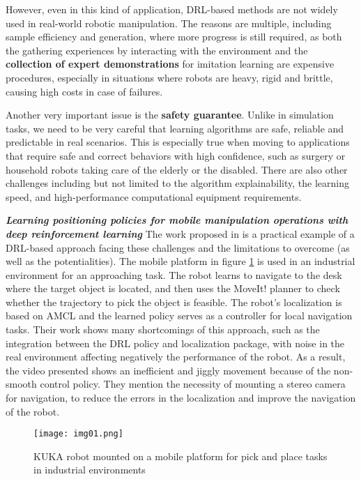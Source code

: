 However, even in this kind of application, DRL-based methods are not widely
used in real-world robotic manipulation. The reasons are multiple, including sample efficiency and generation,
where more progress is still required, as both the gathering experiences by interacting with
the environment and the \textbf{collection of expert demonstrations} for imitation learning are expensive
procedures, especially in situations where robots are heavy, rigid and brittle, causing high costs in case of failures.

Another very important issue is the \textbf{safety guarantee}.
Unlike in simulation tasks, we need to be very careful that learning
algorithms are safe, reliable and predictable in real scenarios. This is especially true
when moving to applications that require safe and correct behaviors with high confidence, such as
surgery or household robots taking care of the elderly or the disabled. There are also other
challenges including but not limited to the algorithm explainability, the learning speed,
and high-performance computational equipment requirements. \cite{liu2021deep}

\textbf{\textit{Learning positioning policies for mobile manipulation operations
		with deep reinforcement learning}}
\quad
The work proposed in \cite{iriondo2023learning} is a practical example of a DRL-based approach
facing these challenges and the limitations to overcome (as well as the potentialities).
The mobile platform in figure \ref{fig:img01} is used in an industrial environment for an
approaching task. The robot learns to navigate to the desk where the target object is located,
and then uses the MoveIt! planner to check whether the trajectory to pick the object is feasible.
The robot's localization is based on AMCL and the learned policy serves as a controller for
local navigation tasks. Their work shows many shortcomings of this approach, such as the
integration between the DRL policy and localization package, with noise in the
real environment affecting negatively the performance of the robot. As a result,
the video presented shows an inefficient and jiggly movement
because of the non-smooth control policy. They mention the necessity of mounting
a stereo camera for navigation, to reduce the errors in the localization and
improve the navigation of the robot.

\begin{figure}[ht]
	\centering
	\texttt{[image: img01.png]}
	\captionsetup{width=0.6\linewidth}
	\caption{KUKA robot mounted on a mobile platform for pick and place tasks
		in industrial environments \cite{iriondo2023learning}}
	\label{fig:img01}
\end{figure}

